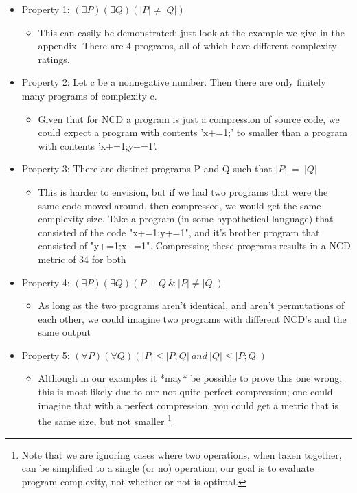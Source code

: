 \documentclass[]{article}
\begin{document}
\begin{itemize}
	\item Property 1: $(\exists P)(\exists Q)(|P|\neq |Q|)$
	\begin{itemize}
		\item This can easily be demonstrated; just look at the example we give in the appendix. There are 4 programs, all of which have different complexity ratings.
	\end{itemize}
	\item Property 2: Let c be a nonnegative number. Then there
are only finitely many programs of complexity c.
	\begin{itemize}
		\item Given that for NCD a program is just a compression of source code, we could expect a program with contents 'x+=1;' to smaller than a program with contents 'x+=1;y+=1'.
	\end{itemize}
	\item Property 3: There are distinct programs P and Q such
that $|P| ~= ~|Q|$
	\begin{itemize}
		\item This is harder to envision, but if we had two programs that were the same code moved around, then compressed, we would get the same complexity size. Take a program (in some hypothetical language) that consisted of the code "x+=1;y+=1", and it's brother program that consisted of "y+=1;x+=1". Compressing these programs results in a NCD metric of 34 for both
	\end{itemize}
	\item Property 4: $(\exists P)(\exists Q)(P \equiv Q ~\& ~|P| \neq |Q|)$
	\begin{itemize}
		\item As long as the two programs aren't identical, and aren't permutations of each other, we could imagine two programs with different NCD's and the same output
	\end{itemize}
	\item Property 5: $(\forall P)(\forall Q)(|P| \leq |P; Q| ~and ~|Q| \leq |P; Q|)$
	\begin{itemize}
		\item Although in our examples it *may* be possible to prove this one wrong, this is most likely due to our not-quite-perfect compression; one could imagine that with a perfect compression, you could get a metric that is the same size, but not smaller \footnote{Note that we are ignoring cases where two operations, when taken together, can be simplified to a single (or no) operation; our goal is to evaluate program complexity, not whether or not is optimal.}

\end{itemize}
\end{itemize}
\end{document}
